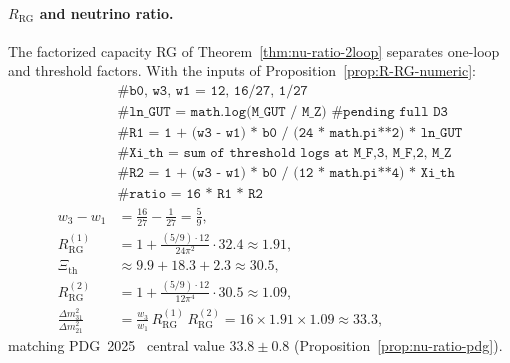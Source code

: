 \paragraph{$R_{\mathrm{RG}}$ and neutrino ratio.}
The factorized capacity RG of Theorem~\ref{thm:nu-ratio-2loop} separates
one-loop and threshold factors. With the inputs of
Proposition~\ref{prop:R-RG-numeric}:
\begin{equation}\label{eq:workbook-R-RG}
\begin{aligned}
  &\texttt{\# b0, w3, w1 = 12, 16/27, 1/27}\\
  &\texttt{\# ln\_GUT = math.log(M\_GUT / M\_Z)  \# pending full D3}\\
  &\texttt{\# R1 = 1 + (w3 - w1) * b0 / (24 * math.pi**2) * ln\_GUT}\\
  &\texttt{\# Xi\_th = sum of threshold logs at M\_F,3, M\_F,2, M\_Z}\\
  &\texttt{\# R2 = 1 + (w3 - w1) * b0 / (12 * math.pi**4) * Xi\_th}\\
  &\texttt{\# ratio = 16 * R1 * R2}\\
  w_3-w_1 &= \frac{16}{27}-\frac{1}{27}=\frac{5}{9},\\
  R_{\mathrm{RG}}^{(1)}
  &= 1+\frac{(5/9)\cdot 12}{24\pi^2}\cdot 32.4
  \approx 1.91,\\
  \Xi_{\mathrm{th}} &\approx 9.9+18.3+2.3 \approx 30.5,\\
  R_{\mathrm{RG}}^{(2)}
  &= 1+\frac{(5/9)\cdot 12}{12\pi^4}\cdot 30.5
  \approx 1.09,\\
  \frac{\Delta m^2_{31}}{\Delta m^2_{21}}
  &= \frac{w_3}{w_1}\,R_{\mathrm{RG}}^{(1)}\,R_{\mathrm{RG}}^{(2)}
  = 16\times 1.91\times 1.09
  \approx 33.3,
\end{aligned}
\end{equation}
matching PDG~2025~\cite{PDG2025} central value $33.8\pm 0.8$
(Proposition~\ref{prop:nu-ratio-pdg}).

